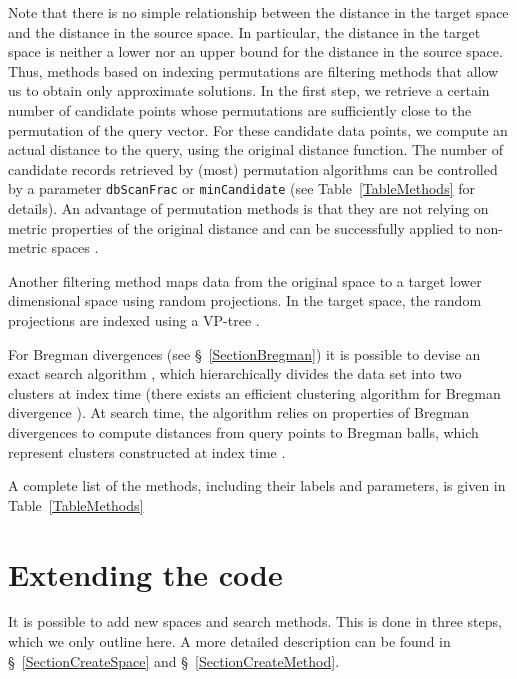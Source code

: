 \documentclass[runningheads,a4paper]{llncs}
\newcommand{\ttt}[1]{\texttt{#1}}
\begin{document}
{Note that there is no simple relationship between the distance in the target space
and the distance in the source space. In particular, the distance in the target space is neither a lower nor an upper bound
for the distance in the source space.
Thus, methods based on indexing permutations are filtering methods that allow us to obtain only approximate solutions.
In the first step, we retrieve a certain number of candidate points whose permutations are sufficiently close
to the permutation of the query vector.
For these candidate data points, we compute an actual distance to the query, using the original distance function.
The number of candidate records retrieved by (most) permutation algorithms can be controlled by a parameter \ttt{dbScanFrac} or \ttt{minCandidate} (see Table~\ref{TableMethods} for details).
An advantage of permutation methods is that they are not relying on metric properties of the original distance 
and can be successfully applied to non-metric spaces \cite{Boytsov_and_Bilegsaikhan:nips2013}.

Another filtering method maps data from the original space to a target lower dimensional space
using random projections. In the target space, the random projections are indexed using
a VP-tree \cite{Uhlmann:1991,Yianilos:1993}.

For Bregman divergences (see \S~\ref{SectionBregman}) it is possible to devise
an exact search algorithm \cite{Cayton:2008},
which hierarchically divides the data set into two clusters  
at index time (there exists an efficient clustering algorithm for Bregman divergence \cite{banerjee2005clustering}).
At search time,
the algorithm relies on properties of Bregman divergences to compute distances from query points to Bregman balls,
which represent clusters constructed at index time \cite{Cayton:2008}.

A complete list of the methods, including their labels and parameters, is given in Table~\ref{TableMethods}

\section{Extending the code}\label{SectionExtend}
It is possible to add new spaces and search methods.
This is done in three steps, which we only outline here.
A more detailed description can be found in \S~\ref{SectionCreateSpace}
and \S~\ref{SectionCreateMethod}.

}
\end{document}
